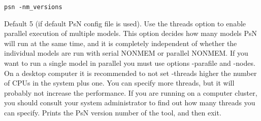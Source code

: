 \begin{optionlist}
\begin{verbatim}
psn -nm_versions
\end{verbatim}
\nextopt
{}
Default 5 (if default PsN config file is used). 
Use the threads option to enable parallel execution of multiple models.
This option decides how many models PsN will run at the same time, and it is completely
independent of whether the individual models are run with serial NONMEM or parallel NONMEM.
If you want to run a single model in parallel you must use options -parafile and -nodes.
On a desktop computer it 
is recommended to not set -threads higher the number of CPUs in the system plus one. 
You can specify more threads, 
but it will probably not increase the performance. If you are running on a computer cluster, 
you should consult your 
system administrator to find out how many threads you can specify. 
\nextopt
{}
Prints the PsN version number of the tool, and then exit. 
\nextopt
\end{optionlist}
